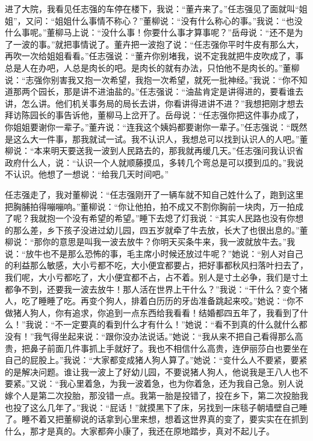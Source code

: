 \documentclass[12pt,oneside]{book}
\begin{document}
进了大院，我看见任志强的车停在楼下，我说：``董卉来了。''任志强见了面就叫``姐姐''，又问：``姐姐什么事情不称心？''董柳说：``没有什么称心的事。''我说：``也没什么事呢。''董柳马上说：``没什么事！你要什么事才算事呢？''岳母说：``还不是为了一波的事。''就把事情说了。董卉把一波抱了说：``任志强你平时牛皮有那么大，再吹一次给姐姐看看。''任志强说：``董卉你别堵我，说不定我就把牛皮吹成了，事总是人在办吧，人总是肉长的吧。是肉长的就有办法，只怕他不是肉长的。''董柳说：``志强你别害我又抱一次希望，我抱一次希望，就死一批神经。''我说：``你不知道那两个园长，那是讲不进油盐的。''任志强说：``油盐肯定是讲得进的，要看谁去讲，怎么讲。他们机关事务局的局长去讲，你看讲得进讲不进？''我想把刚才想去拜访陈园长的事告诉他，董柳马上岔开了。岳母说：``任志强你把这件事办成了，你姐姐要谢你一辈子。''董卉说：``连我这个姨妈都要谢你一辈子。''任志强说：``既然是这么大一件事，那我就试一试。我不认识人，我想总可以找到认识人的人吧。''董柳说：``本来明天要送我一波到人民路去的，那我就再缓几天。''任志强问我认识省政府什么人，说：``认识一个人就顺藤摸瓜，多转几个弯总是可以摸到瓜的。''我说不认识。他想了一想说：``给我几天时间吧。''

任志强走了，我对董柳说：``任志强刚开了一辆车就不知自己姓什么了，跑到这里把胸脯拍得嘣嘣响。''董柳说：``你让他拍，拍不成又不割你胸前一块肉，万一拍成了呢？我就抱一个没有希望的希望。''睡下去熄了灯我说：``其实人民路也没有你想的那么差，乡下孩子没进过幼儿园，四五岁就牵了牛去放，长大了也很出息的。''董柳说：``那你的意思是叫我一波去放牛？你明天买条牛来，我一波就放牛去。''我说：``放牛也不是那么恐怖的事，毛主席小时候还放过牛呢？''她说：``别人对自己的利益那么敏感，大小亏都不吃，大小便宜都要占，把好事都秋风扫落叶扫去了，我们呢，大小亏都吃了，大小便宜都不占，占不着。别人是寸土必争，我们是寸土都争不到，还要我一波去放牛！那人活在世界上干什么？''我说：``干什么？变个猪人，吃了睡睡了吃。再变个狗人，排着白历历的牙齿准备跳起来咬。''她说：``你不做猪人狗人，你有追求，你追到一点东西给我看看！结婚都四五年了，我看到了什么！''我说：``不一定要真的看到什么才有什么！''她说：``看不到真的什么就什么都没有！''我气得坐起来说：``跟你没办法说话。''她说：``我从来不把自己看得那么高贵，把鼻子前面几件事抓上手就好了。我也不相信什么高贵，连伊丽莎白也要坐在自己的屁股上。''我说：``大家都变成猪人狗人算了。''她说：``变什么人不要紧，要紧的是解决问题。谁让我一波上了好幼儿园，不要说猪人狗人，他说我是王八人也不要紧。''又说：``我心里着急，为我一波着急，也为你着急，还为我自己急。别人说嫁个人是第二次投胎，那没错一点。我第一胎是投错了，投在乡下，第二次投胎我也投了这么几年了。''我说：``屁话！''就摸黑下了床，另找到一床毯子朝墙壁自己睡了。睡不着又把董柳说的话拿到心里来想，想着这世界真的变了，要实实在在抓到什么，那才是真的。大家都奔小康了，我还在原地踏步，真对不起儿子。
\end{document}
